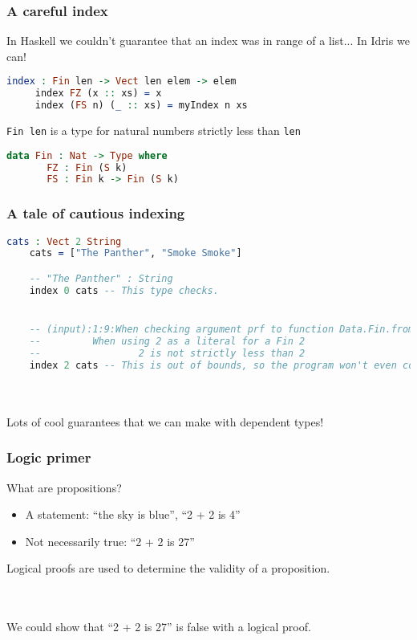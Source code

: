 \documentclass{beamer}
\begin{document}
\begin{frame}[fragile]
  \frametitle{A careful index}

  In Haskell we couldn't guarantee that an index was in range of a list... \pause In Idris we can!

  \pause
  \begin{lstlisting}[language=Idris]
     index : Fin len -> Vect len elem -> elem
     index FZ (x :: xs) = x
     index (FS n) (_ :: xs) = myIndex n xs 
   \end{lstlisting}

   \texttt{Fin len} is a type for natural numbers strictly less than \texttt{len}

   \pause

   \begin{lstlisting}[language=Idris]
     data Fin : Nat -> Type where
       FZ : Fin (S k)
       FS : Fin k -> Fin (S k)
     \end{lstlisting}

   \pause
\end{frame}

\begin{frame}[fragile]
  \frametitle{A tale of cautious indexing}

  \begin{lstlisting}[language=Idris]
    cats : Vect 2 String
    cats = ["The Panther", "Smoke Smoke"]

    -- "The Panther" : String
    index 0 cats -- This type checks.


    -- (input):1:9:When checking argument prf to function Data.Fin.fromInteger:
    --         When using 2 as a literal for a Fin 2 
    --                 2 is not strictly less than 2
    index 2 cats -- This is out of bounds, so the program won't even compile!
  \end{lstlisting}

  \pause \\~\\

  \huge{Lots of cool guarantees that we can make with dependent types!}
\end{frame}

\begin{frame}
  \frametitle{Logic primer}

  What are propositions?

  \begin{itemize}
  \pause
  \item A statement: ``the sky is blue'', ``2 + 2 is 4''
  \pause
  \item Not necessarily true: ``2 + 2 is 27''
  \end{itemize}

  \pause

  Logical proofs are used to determine the validity of a proposition.

  \pause \\~\\

  We could show that ``2 + 2 is 27'' is false with a logical proof.
\end{frame}
\end{document}
